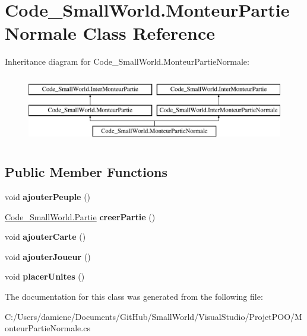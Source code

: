 \hypertarget{class_code___small_world_1_1_monteur_partie_normale}{\section{Code\-\_\-\-Small\-World.\-Monteur\-Partie\-Normale Class Reference}
\label{class_code___small_world_1_1_monteur_partie_normale}
}
Inheritance diagram for Code\-\_\-\-Small\-World.\-Monteur\-Partie\-Normale\-:\begin{figure}[H]
\begin{center}
\leavevmode
\includegraphics[height=3.000000cm]{class_code___small_world_1_1_monteur_partie_normale}
\end{center}
\end{figure}
\subsection*{Public Member Functions}
\begin{DoxyCompactItemize}
\item 
\hypertarget{class_code___small_world_1_1_monteur_partie_normale_af5450316c27e580d2de37f21d140863b}{void {\bfseries ajouter\-Peuple} ()}\label{class_code___small_world_1_1_monteur_partie_normale_af5450316c27e580d2de37f21d140863b}

\item 
\hypertarget{class_code___small_world_1_1_monteur_partie_normale_ad962266a5b272be6c4d01e91c8ded1cc}{\hyperlink{interface_code___small_world_1_1_partie}{Code\-\_\-\-Small\-World.\-Partie} {\bfseries creer\-Partie} ()}\label{class_code___small_world_1_1_monteur_partie_normale_ad962266a5b272be6c4d01e91c8ded1cc}

\item 
\hypertarget{class_code___small_world_1_1_monteur_partie_normale_ad17c12a99177de2562802a6f0f8f1a08}{void {\bfseries ajouter\-Carte} ()}\label{class_code___small_world_1_1_monteur_partie_normale_ad17c12a99177de2562802a6f0f8f1a08}

\item 
\hypertarget{class_code___small_world_1_1_monteur_partie_normale_a9487b01a5f55d9a33b34d77df503bbf1}{void {\bfseries ajouter\-Joueur} ()}\label{class_code___small_world_1_1_monteur_partie_normale_a9487b01a5f55d9a33b34d77df503bbf1}

\item 
\hypertarget{class_code___small_world_1_1_monteur_partie_normale_a00af0190687d4dcf96cf3c208ede5192}{void {\bfseries placer\-Unites} ()}\label{class_code___small_world_1_1_monteur_partie_normale_a00af0190687d4dcf96cf3c208ede5192}

\end{DoxyCompactItemize}


The documentation for this class was generated from the following file\-:\begin{DoxyCompactItemize}
\item 
C\-:/\-Users/damienc/\-Documents/\-Git\-Hub/\-Small\-World/\-Visual\-Studio/\-Projet\-P\-O\-O/Monteur\-Partie\-Normale.\-cs\end{DoxyCompactItemize}
